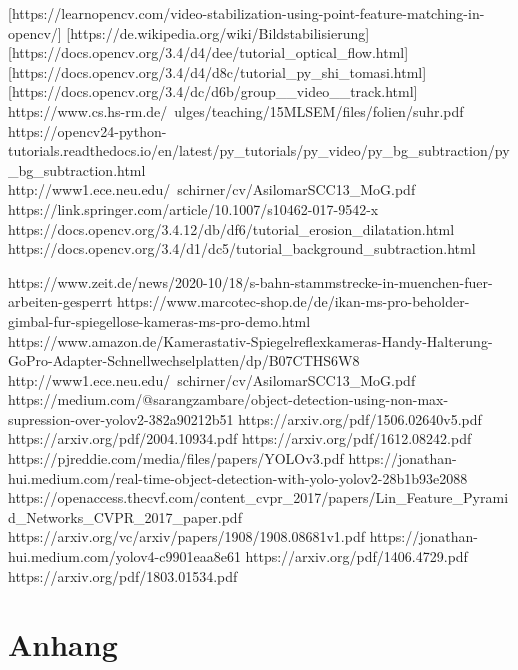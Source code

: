 \documentclass[conference]{IEEEtran}
\begin{document}
	[https://learnopencv.com/video-stabilization-using-point-feature-matching-in-opencv/]
	[https://de.wikipedia.org/wiki/Bildstabilisierung]	
	[https://docs.opencv.org/3.4/d4/dee/tutorial\_optical\_flow.html]
	[https://docs.opencv.org/3.4/d4/d8c/tutorial\_py\_shi\_tomasi.html]	
	[https://docs.opencv.org/3.4/dc/d6b/group\_\_video\_\_track.html]
	https://www.cs.hs-rm.de/~ulges/teaching/15MLSEM/files/folien/suhr.pdf
	https://opencv24-python-tutorials.readthedocs.io/en/latest/py\_tutorials/py\_video/py\_bg\_subtraction/py\_bg\_subtraction.html
	http://www1.ece.neu.edu/~schirner/cv/AsilomarSCC13\_MoG.pdf
	https://link.springer.com/article/10.1007/s10462-017-9542-x
	https://docs.opencv.org/3.4.12/db/df6/tutorial\_erosion\_dilatation.html
	https://docs.opencv.org/3.4/d1/dc5/tutorial\_background\_subtraction.html
	
	
	\begin{thebibliography}{00}
		https://www.zeit.de/news/2020-10/18/s-bahn-stammstrecke-in-muenchen-fuer-arbeiten-gesperrt
		https://www.marcotec-shop.de/de/ikan-ms-pro-beholder-gimbal-fur-spiegellose-kameras-ms-pro-demo.html
		https://www.amazon.de/Kamerastativ-Spiegelreflexkameras-Handy-Halterung-GoPro-Adapter-Schnellwechselplatten/dp/B07CTHS6W8
		http://www1.ece.neu.edu/~schirner/cv/AsilomarSCC13\_MoG.pdf
		https://medium.com/@sarangzambare/object-detection-using-non-max-supression-over-yolov2-382a90212b51
		https://arxiv.org/pdf/1506.02640v5.pdf
		https://arxiv.org/pdf/2004.10934.pdf %
		https://arxiv.org/pdf/1612.08242.pdf %
		https://pjreddie.com/media/files/papers/YOLOv3.pdf %
		https://jonathan-hui.medium.com/real-time-object-detection-with-yolo-yolov2-28b1b93e2088 %
		https://openaccess.thecvf.com/content\_cvpr\_2017/papers/Lin\_Feature\_Pyramid\_Networks\_CVPR\_2017\_paper.pdf %
		https://arxiv.org/vc/arxiv/papers/1908/1908.08681v1.pdf%
		https://jonathan-hui.medium.com/yolov4-c9901eaa8e61 %
		https://arxiv.org/pdf/1406.4729.pdf %
		https://arxiv.org/pdf/1803.01534.pdf %
	\end{thebibliography}
	
	\section{Anhang}
	
	
\end{document}
